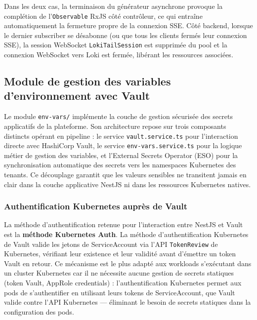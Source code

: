 Dans les deux cas, la terminaison du générateur asynchrone provoque la complétion de l'\texttt{Observable} RxJS côté contrôleur, ce qui entraîne automatiquement la fermeture propre de la connexion SSE. Côté backend, lorsque le dernier subscriber se désabonne (ou que tous les clients fermés leur connexion SSE), la session WebSocket \texttt{LokiTailSession} est supprimée du pool et la connexion WebSocket vers Loki est fermée, libérant les ressources associées.

\subsection{Module de gestion des variables d'environnement avec Vault}

Le module \texttt{env-vars/} implémente la couche de gestion sécurisée des secrets applicatifs de la plateforme. Son architecture repose sur trois composants distincts opérant en pipeline : le service \texttt{vault.service.ts} pour l'interaction directe avec HashiCorp Vault, le service \texttt{env-vars.service.ts} pour la logique métier de gestion des variables, et l'External Secrets Operator (ESO) pour la synchronisation automatique des secrets vers les namespaces Kubernetes des tenants. Ce découplage garantit que les valeurs sensibles ne transitent jamais en clair dans la couche applicative NestJS ni dans les ressources Kubernetes natives.

\subsubsection*{Authentification Kubernetes auprès de Vault}

La méthode d'authentification retenue pour l'interaction entre NestJS et Vault est la \textbf{méthode Kubernetes Auth}. La méthode d'authentification Kubernetes de Vault valide les jetons de ServiceAccount via l'API \texttt{TokenReview} de Kubernetes, vérifiant leur existence et leur validité avant d'émettre un token Vault en retour.  Ce mécanisme est le plus adapté aux workloads s'exécutant dans un cluster Kubernetes car il ne nécessite aucune gestion de secrets statiques (token Vault, AppRole credentials) : l'authentification Kubernetes permet aux pods de s'authentifier en utilisant leurs tokens de ServiceAccount, que Vault valide contre l'API Kubernetes — éliminant le besoin de secrets statiques dans la configuration des pods. 

